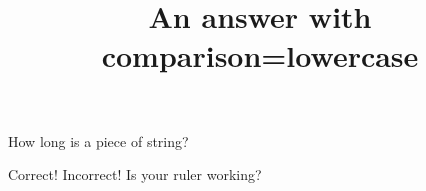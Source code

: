 \documentclass[hidesidemenu]{webquiz}
\title{An answer with comparison=lowercase}
\begin{document}
  \begin{question}     %
     How long is a piece of string?

     \whenRight Correct!
     \whenWrong Incorrect! Is your ruler working?
  \end{question}
\end{document}
